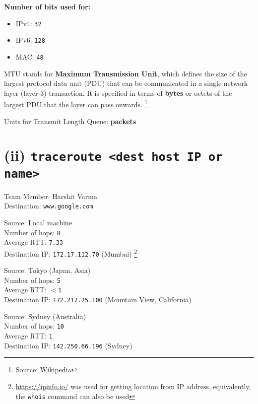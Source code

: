 \documentclass[11pt, fleqn]{article}
\begin{document}
\textbf{Number of bits used for:}
\begin{itemize}[itemsep=-1ex]
    \item IPv4: \texttt{32}
    \item IPv6: \texttt{128}
    \item MAC: \texttt{48}
\end{itemize}

\hrulefill
\medskip 

MTU stands for \textbf{Maximum Transmission Unit}, which defines the size of the largest protocol data unit (PDU) that can be communicated in a single network layer (layer-3) transaction. It is specified in terms of \textbf{bytes} or octets of the largest PDU that the layer can pass onwards. \footnote{Source:  \href{https://en.wikipedia.org/wiki/Maximum_transmission_unit}{Wikipedia} }

\hrulefill
\medskip

Units for Transmit Length Queue: \textbf{packets}


\newpage
\section*{(ii) \texttt{traceroute <dest host IP or name>}}
\label{partb}
\setcounter{equation}{0}

Team Member: Harshit Varma\\
Destination: \texttt{www.google.com}

\hrulefill
\smallskip

Source: Local machine\\
Number of hops: \texttt{8}\\
Average RTT: \texttt{7.33}\\
Destination IP: \texttt{172.17.112.70} (Mumbai) \footnote{\url{https://ipinfo.io/} was used for getting location from IP address, equivalently, the \texttt{whois} command can also be used}

\hrulefill
\smallskip

Source: Tokyo (Japan, Asia)\\
Number of hops: \texttt{5}\\
Average RTT: $<$\texttt{1}\\
Destination IP: \texttt{172.217.25.100} (Mountain View, California)

\hrulefill
\smallskip

Source: Sydney (Australia)\\
Number of hops: \texttt{10}\\
Average RTT: \texttt{1}\\
Destination IP: \texttt{142.250.66.196} (Sydney)
\end{document}
